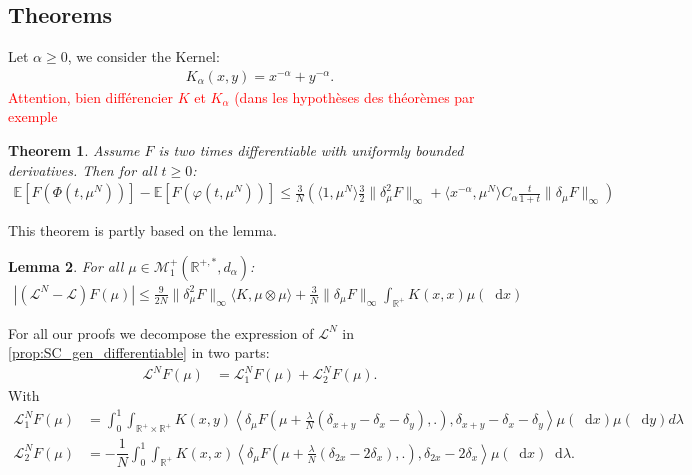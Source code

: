 \documentclass[11pt,a4paper]{article}
\newcommand{\RR}{\mathbb{R}}
\newcommand{\MC}{\mathcal{M}}
\newcommand{\LC}{\mathcal{L}}
\newcommand{\red}[1]{\textcolor{red}{#1}}
\newcommand{\E}[1]{\mathbb{E}\left[#1\right]}
\newcommand{\dd}{\mathop{}\!\mathrm{d}}
\newtheorem{theorem}{Theorem}[section]
\newtheorem{lemma}[theorem]{Lemma}
\begin{document}
\subsection{Theorems}
Let $\alpha \geq 0$, we consider the Kernel:
\begin{align*}
    K_\alpha(x,y) = x^{-\alpha} + y^{-\alpha}.
\end{align*}
\red{Attention, bien différencier $K$ et $K_\alpha$ (dans les hypothèses des théorèmes par exemple}
\begin{theorem}
    Assume $F$ is two times differentiable with uniformly bounded derivatives. Then for all $t\geq 0$:
    \begin{align*}
        \E{F(\Phi(t,\mu^N))} - \E{F(\varphi\left(t,\mu^N\right))} \leq \frac{3}{N}\left(\langle 1,\mu^N \rangle \frac{3}{2}\|\delta_\mu^2 F\|_{\infty} +  \langle x^{-\alpha},\mu^N \rangle C_\alpha\frac{t}{1 + t}\|\delta_\mu F\|_{\infty}\right)
    \end{align*}
\end{theorem}
This theorem is partly based on the lemma.
\begin{lemma}\label{lem:bounds_diff_gen}
For all $\mu \in \MC^+_1 \left( \RR^{+,*},d_\alpha\right)$:
\begin{align*}
    \left| \left(\LC^N - \LC\right)F(\mu) \right| \leq \frac{9}{2N}\|\delta_\mu^2 F\|_{\infty}\langle K,\mu\otimes\mu\rangle + \frac{3}{N}\|\delta_\mu F\|_{\infty}\int_{\RR^+} K(x,x)\mu(\dd x)
\end{align*}
\end{lemma}For all our proofs we decompose the expression of $\LC^N$ in \ref{prop:SC_gen_differentiable} in two parts:
\begin{align*}
        \LC^N F(\mu) &= \LC_1^N F(\mu) + \LC_2^N F(\mu).
\end{align*}
With
\begin{align*}
        \LC_1^N F(\mu) &= \int_0^1 \int_{\RR^+ \times \RR^+} K(x,y)\left\langle  \delta_\mu F\left(\mu + \frac{\lambda}{N}\left(\delta_{x + y} - \delta_x - \delta_y \right),.\right),\delta_{x+y} - \delta_x - \delta_y\right\rangle\mu(\dd x)\mu(\dd y)d\lambda \\
        \LC_2^N F(\mu) &= -\dfrac{1}{N}\int_0^1\int_{\RR^+} K(x,x)\left\langle  \delta_\mu F\left(\mu + \frac{\lambda}{N}\left(\delta_{2x} - 2\delta_x \right),.\right),\delta_{2x} - 2\delta_x \right\rangle\mu(\dd x)\dd\lambda.
\end{align*}
\end{document}
